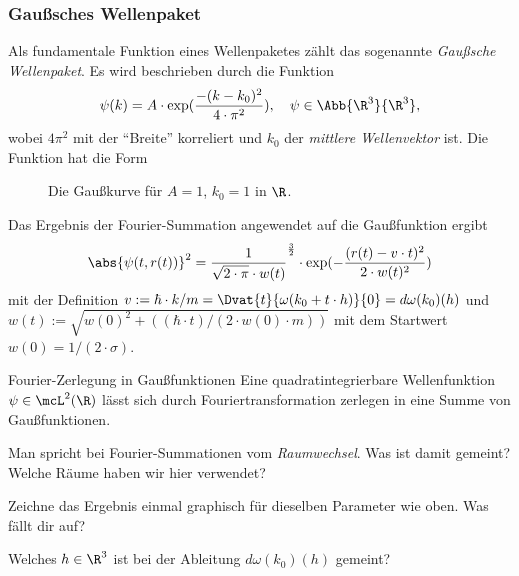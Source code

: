 \documentclass{subfiles}
\begin{document}

    \subsubsection*{Gaußsches Wellenpaket}
        Als fundamentale Funktion eines Wellenpaketes zählt das sogenannte \textit{Gaußsche Wellenpaket}. Es wird beschrieben durch die Funktion 
        \[\psi(k) = A\cdot\exp(\frac{-(k - k_0)^2}{4\cdot\pi^2}),\quad \psi\in\Abb{\R^3}{\R^3},\]
        wobei $4\pi^2$ mit der \enquote{Breite} korreliert und $k_0$ der \emph{mittlere Wellenvektor} ist. Die Funktion hat die Form
        \begin{figure}[H]
            \centering
            \caption{Die Gaußkurve für $A=1$, $k_0=1$ in $\R$.}
        \end{figure}
        Das Ergebnis der Fourier-Summation angewendet auf die Gaußfunktion ergibt 
        \[\abs{\psi(t,r(t))}^2 = \frac{1}{\sqrt{2\cdot\pi}\cdot w(t)}^{\frac{3}{2}}\cdot\exp(-\frac{(r(t)-v\cdot t)^2}{2\cdot w(t)^2})\]
        mit der Definition $v:=\hbar\cdot k/m = \Dvat{t}{\omega(k_0 + t\cdot h)}{0} = d\omega(k_0)(h)$ und $w(t) := \sqrt{w(0)^2 + ((\hbar\cdot t)/(2\cdot w(0)\cdot m))}$ mit dem Startwert $w(0) = 1/(2\cdot\sigma)$. 
        \begin{mcor}{Fourier-Zerlegung in Gaußfunktionen}
            Eine quadratintegrierbare Wellenfunktion $\psi\in\mcL^2(\R)$ lässt sich durch Fouriertransformation zerlegen in eine Summe von Gaußfunktionen.
        \end{mcor}
        \begin{Aufgabe}
            \nr{} Man spricht bei Fourier-Summationen vom \emph{Raumwechsel}. Was ist damit gemeint? Welche Räume haben wir hier verwendet?

            \nr{} Zeichne das Ergebnis einmal graphisch für dieselben Parameter wie oben. Was fällt dir auf?

            \nr{} Welches $h\in\R^3$ ist bei der Ableitung $d\omega(k_0)(h)$ gemeint?
        \end{Aufgabe}
        
\end{document}
